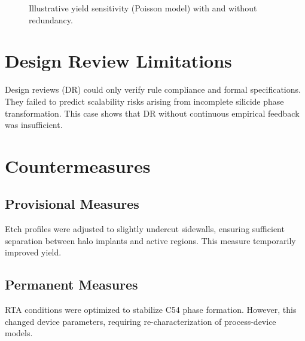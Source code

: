 \documentclass[conference]{IEEEtran}
\begin{document}
\begin{figure}[!t]
  \centering
  \caption{Illustrative yield sensitivity (Poisson model) with and without redundancy.}
  \label{fig:yield}
\end{figure}

\section{Design Review Limitations}
Design reviews (DR) could only verify rule compliance and formal specifications. 
They failed to predict scalability risks arising from incomplete silicide phase transformation.  
This case shows that DR without continuous empirical feedback was insufficient.

\section{Countermeasures}
\subsection{Provisional Measures}
Etch profiles were adjusted to slightly undercut sidewalls, ensuring sufficient separation between halo implants and active regions. 
This measure temporarily improved yield.

\subsection{Permanent Measures}
RTA conditions were optimized to stabilize C54 phase formation. 
However, this changed device parameters, requiring re-characterization of process-device models.
\end{document}
